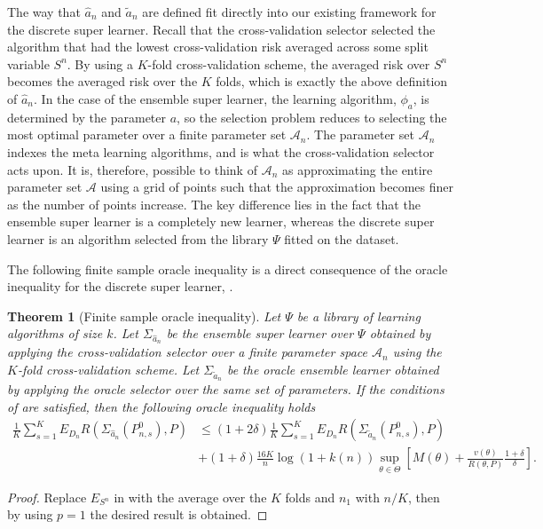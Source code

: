 \documentclass[11pt, a4paper]{article}
\newtheorem{theorem}{Theorem}
\theoremstyle{definition}
\theoremstyle{remark}
\newcommand{\btheta}{\theta}
\newcommand{\Sn}{S^n}
\newcommand{\lib}{\Psi}
\newcommand{\meta}{\phi}
\newcommand{\esl}{\Sigma}
\begin{document}
The way that $ \hat{a}_n  $ and $ \tilde{a}_n $ are defined fit directly into our existing framework for the discrete super learner. Recall that the cross-validation selector selected the algorithm that had the lowest cross-validation risk averaged across some split variable $ \Sn $. By using a $ K $-fold cross-validation scheme, the averaged risk over $ \Sn $ becomes the averaged risk over the $ K $ folds, which is exactly the above definition of $ \hat{a}_n $. In the case of the ensemble super learner, the learning algorithm, $ \meta_{a} $, is determined by the parameter $ a $, so the selection problem reduces to selecting the most optimal parameter over a finite parameter set $ \mathcal{A}_n $. The parameter set $ \mathcal{A}_n $ indexes the meta learning algorithms, and is what the cross-validation selector acts upon. It is, therefore, possible to think of $ \mathcal{A}_n $ as approximating the entire parameter set $ \mathcal{A} $ using a grid of points such that the approximation becomes finer as the number of points increase. The key difference lies in the fact that the ensemble super learner is a completely new learner, whereas the discrete super learner is an algorithm selected from the library $ \lib $ fitted on the dataset.

The following finite sample oracle inequality is a direct consequence of the oracle inequality for the discrete super learner, .
\begin{theorem}[Finite sample oracle inequality]
    Let $ \lib $ be a library of learning algorithms of size $ k $. Let $ \esl_{ \hat{a}_{n} } $ be the ensemble super learner over $ \lib $ obtained by applying the cross-validation selector over a finite parameter space $ \mathcal{A}_n $ using the $ K $-fold cross-validation scheme. Let $ \esl_{ \tilde{a}_n } $ be the oracle ensemble learner obtained by applying the oracle selector over the same set of parameters. If the conditions of  are satisfied, then the following oracle inequality holds
    \begin{align*}
        \frac{1}{K} \sum_{s = 1}^{K} E_{D_n} R(\esl_{ \hat{a}_n }(P_{n, s}^{0}) , P) &\leq (1 + 2 \delta) \frac{1}{K} \sum_{s = 1}^{K} E_{D_n} R(\esl_{ \tilde{a}_n }(P_{n,s}^{0}), P) \\
                                                                                     &+ (1 + \delta) \frac{16 K}{n} \log(1 + k(n)) \sup_{\btheta \in \Theta} \left[ M(\btheta)+ \frac{v(\btheta)}{R(\btheta, P)} \frac{1 + \delta}{\delta} \right].  
    \end{align*}
\end{theorem}
\begin{proof}
    Replace $ E_{\Sn} $ in  with the average over the $ K $ folds and $ n_1$ with $n/K $, then by using $ p = 1 $ the desired result is obtained.  
\end{proof}
\end{document}
